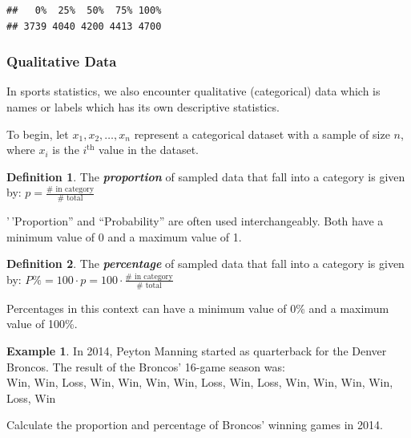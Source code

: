 \documentclass[
  11pt,
]{book}
\theoremstyle{definition}
\newtheorem{definition}{Definition}[chapter]
\theoremstyle{definition}
\newtheorem{example}{Example}[chapter]
\theoremstyle{definition}
\theoremstyle{definition}
\theoremstyle{remark}
\begin{document}
\begin{verbatim}
##   0%  25%  50%  75% 100% 
## 3739 4040 4200 4413 4700
\end{verbatim}

\vfill
\newpage

\hypertarget{qualitative-data}{%
\subsubsection{Qualitative Data}\label{qualitative-data}}

In sports statistics, we also encounter qualitative (categorical) data which is names or labels which has its own descriptive statistics.

To begin, let \(x_1, x_2, \ldots, x_n\) represent a categorical dataset with a sample of size \(n\), where \(x_i\) is the \(i^\text{th}\) value in the dataset.

\begin{definition}
The \textbf{\emph{proportion}} of sampled data that fall into a category is given by: \(p = \frac{\#\text{ in category}}{\#\text{ total}}\)
\end{definition}

'\,'Proportion'' and ``Probability'' are often used interchangeably. Both have a minimum value of 0 and a maximum value of 1.

\begin{definition}
The \textbf{\emph{percentage}} of sampled data that fall into a category is given by: \(P\% = 100 \cdot p = 100 \cdot \frac{\#\text{ in category}}{\#\text{ total}}\)
\end{definition}

Percentages in this context can have a minimum value of 0\% and a maximum value of 100\%.

\begin{example}
In 2014, Peyton Manning started as quarterback for the Denver Broncos. The result of the Broncos' 16-game season was:\\
Win, Win, Loss, Win, Win, Win, Win, Loss, Win, Loss, Win, Win, Win, Win, Loss, Win

Calculate the proportion and percentage of Broncos' winning games in 2014.
\end{example}

\hfill\break
\hfill\break
\hfill\break
\hfill\break
\hfill\break
\end{document}
